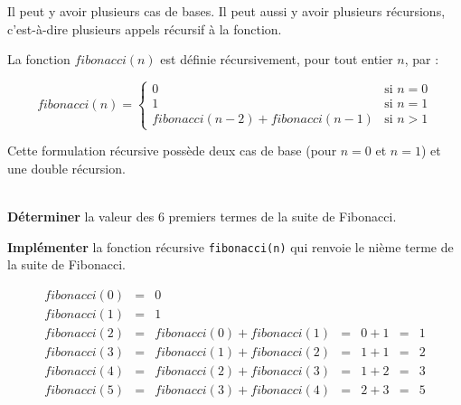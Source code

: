 \documentclass[a4paper,17pt]{extarticle}
\newenvironment{eleve}%
{\begin{activite}\color{noiramu}\\[-0.5cm]}
{\end{activite}}
\begin{document}
Il peut y avoir plusieurs cas de bases. Il peut aussi y avoir plusieurs
récursions, c'est-à-dire plusieurs appels récursif à la fonction.
\begin{exemple}
    La fonction \(fibonacci(n)\) est définie récursivement, pour tout entier
\(n\), par :

\[ 
fibonacci(n) = 
\left\{
    \begin{array}{ll}
        0 & \text{si $n=0$}\\
        1 & \text{si $n=1$}\\
        fibonacci(n-2) + fibonacci(n-1) & \text{si $n>1$}
    \end{array}
\right.
\]

Cette formulation récursive possède deux cas de base (pour \(n=0\) et
\(n=1\)) et une double récursion.

            \end{exemple}\begin{eleve}
    \textbf{Déterminer} la valeur des 6 premiers termes de la suite de
Fibonacci.

\textbf{Implémenter} la fonction récursive \texttt{fibonacci(n)} qui
renvoie le nième terme de la suite de Fibonacci.
        
        \end{eleve}\begin{reponse}
    \[
\begin{array}{lllllll}
fibonacci(0) & = & 0 \\
fibonacci(1) & = & 1 \\
fibonacci(2) & = & fibonacci(0) + fibonacci(1) & = & 0+1 & = & 1 \\
fibonacci(3) & = & fibonacci(1) + fibonacci(2) & = & 1+1 & = & 2 \\
fibonacci(4) & = & fibonacci(2) + fibonacci(3) & = & 1+2 & = & 3 \\
fibonacci(5) & = & fibonacci(3) + fibonacci(4) & = & 2+3 & = & 5
\end{array}
\]

            \end{reponse}
\end{document}
